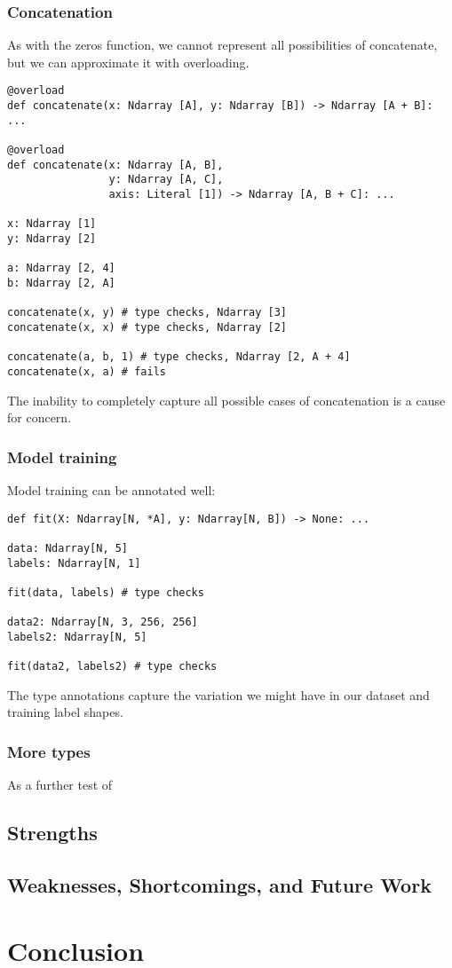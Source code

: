 \documentclass{report}
\begin{document}
\subsection{Concatenation}
As with the zeros function, we cannot represent all possibilities of concatenate, but we can approximate it with overloading.

\begin{singlespace*}
    \begin{verbatim}
@overload
def concatenate(x: Ndarray [A], y: Ndarray [B]) -> Ndarray [A + B]: ...

@overload
def concatenate(x: Ndarray [A, B],
                y: Ndarray [A, C],
                axis: Literal [1]) -> Ndarray [A, B + C]: ...

x: Ndarray [1]
y: Ndarray [2]

a: Ndarray [2, 4]
b: Ndarray [2, A]

concatenate(x, y) # type checks, Ndarray [3]
concatenate(x, x) # type checks, Ndarray [2]

concatenate(a, b, 1) # type checks, Ndarray [2, A + 4]
concatenate(x, a) # fails\end{verbatim}
\end{singlespace*}
The inability to completely capture all possible cases of concatenation is a cause for concern.

\subsection{Model training}
Model training can be annotated well:
\begin{singlespace*}
    \begin{verbatim}
def fit(X: Ndarray[N, *A], y: Ndarray[N, B]) -> None: ...

data: Ndarray[N, 5]
labels: Ndarray[N, 1]

fit(data, labels) # type checks

data2: Ndarray[N, 3, 256, 256]
labels2: Ndarray[N, 5]

fit(data2, labels2) # type checks\end{verbatim}
\end{singlespace*}
The type annotations capture the variation we might have in our dataset and training label shapes.

\subsection{More types}

As a further test of

\section{Strengths}

\section{Weaknesses, Shortcomings, and Future Work}

\chapter{Conclusion}



\end{document}
